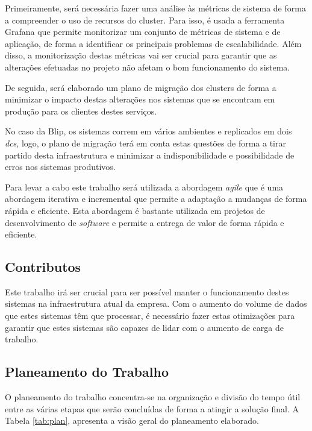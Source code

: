 Primeiramente, será necessária fazer uma análise às métricas de sistema de forma a compreender
o uso de recursos do \gls{cluster}. Para isso, é usada a ferramenta Grafana que permite
monitorizar um conjunto de métricas de sistema e de aplicação, de forma a identificar os principais
problemas de escalabilidade. Além disso, a monitorização destas métricas vai ser crucial para
garantir que as alterações efetuadas no projeto não afetam o bom funcionamento do sistema.

De seguida, será elaborado um plano de migração dos \glspl{cluster} de forma a minimizar o 
impacto destas alterações nos sistemas que se encontram em produção para os clientes destes serviços.

No caso da Blip, os sistemas correm em vários ambientes e replicados em dois \textit{\glspl{dc}},
logo, o plano de migração terá em conta estas questões de forma a tirar partido desta infraestrutura
e minimizar a indisponibilidade e possibilidade de erros nos sistemas produtivos.

Para levar a cabo este trabalho será utilizada a abordagem \textit{agile} que é uma abordagem
iterativa e incremental que permite a adaptação a mudanças de forma rápida e eficiente. Esta abordagem
é bastante utilizada em projetos de desenvolvimento de \textit{software} e permite a entrega de valor
de forma rápida e eficiente.

\subsection{Contributos}

Este trabalho irá ser crucial para ser possível manter o funcionamento destes sistemas na
infraestrutura atual da empresa. Com o aumento do volume de dados que estes sistemas têm que
processar, é necessário fazer estas otimizações para garantir que estes sistemas são capazes
de lidar com o aumento de carga de trabalho.

\subsection{Planeamento do Trabalho}

O planeamento do trabalho concentra-se na organização e divisão do tempo útil entre as várias etapas
que serão concluídas de forma a atingir a solução final. A Tabela \ref{tab:plan}, apresenta a visão
geral do planeamento elaborado.


